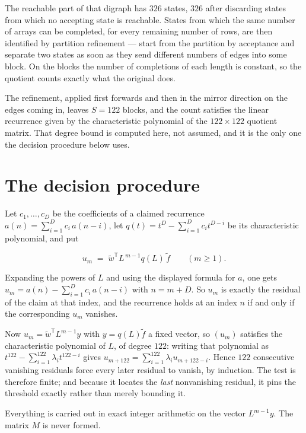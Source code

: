 \documentclass[11pt]{article}
\theoremstyle{definition}
\begin{document}
The reachable part of that digraph has $326$ states, $326$ after discarding states from which no accepting state is reachable. States from which the same number of arrays can be completed, for every remaining number of rows, are then identified by partition refinement --- start from the partition by acceptance and separate two states as soon as they send different numbers of edges into some block. On the blocks the number of completions of each length is constant, so the quotient counts exactly what the original does.

The refinement, applied first forwards and then in the mirror direction on the edges coming in, leaves $S = 122$ blocks, and the count satisfies the linear recurrence given by the characteristic polynomial of the $122 \times 122$ quotient matrix. That degree bound is computed here, not assumed, and it is the only one the decision procedure below uses.

\section{The decision procedure}

Let $c_1,\dots,c_D$ be the coefficients of a claimed recurrence $a(n) = \sum_{i=1}^{D} c_i\,a(n-i)$, let $q(t) = t^{D} - \sum_{i=1}^{D} c_i t^{D-i}$ be its characteristic polynomial, and put

\[u_m \;=\; \tilde w^{\mathsf T} L^{\,m-1} q(L)\,\tilde f \qquad (m \ge 1).\]

Expanding the powers of $L$ and using the displayed formula for $a$, one gets $u_m = a(n) - \sum_{i=1}^{D} c_i\,a(n-i)$ with $n = m + D$. So $u_m$ is exactly the residual of the claim at that index, and the recurrence holds at an index $n$ if and only if the corresponding $u_m$ vanishes.

Now $u_m = \tilde w^{\mathsf T} L^{m-1} y$ with $y = q(L)\tilde f$ a fixed vector, so $(u_m)$ satisfies the characteristic polynomial of $L$, of degree $122$: writing that polynomial as $t^{122} - \sum_{i=1}^{122} \lambda_i t^{122-i}$ gives $u_{m+122} = \sum_{i=1}^{122} \lambda_i u_{m+122-i}$. Hence $122$ consecutive vanishing residuals force every later residual to vanish, by induction. The test is therefore finite; and because it locates the {\itshape last} nonvanishing residual, it pins the threshold exactly rather than merely bounding it.

Everything is carried out in exact integer arithmetic on the vector $L^{m-1}y$. The matrix $M$ is never formed.
\end{document}
